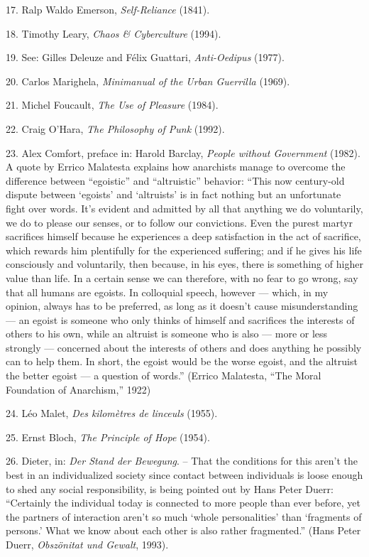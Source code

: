 {    17. Ralp Waldo Emerson, \textit{Self-Reliance} (1841).

    18. Timothy Leary, \textit{Chaos \& Cyberculture} (1994).

    19. See: Gilles Deleuze and Félix Guattari, \textit{Anti-Oedipus} (1977).

    20. Carlos Marighela, \textit{Minimanual of the Urban Guerrilla} (1969).

    21. Michel Foucault, \textit{The Use of Pleasure} (1984).

    22. Craig O’Hara, \textit{The Philosophy of Punk} (1992).

    23. Alex Comfort, preface in: Harold Barclay, \textit{People without
    Government} (1982). A quote by Errico Malatesta explains how anarchists
    manage to overcome the difference between “egoistic” and “altruistic”
    behavior: “This now century-old dispute between ‘egoists’ and ‘altruists’ is
    in fact nothing but an unfortunate fight over words. It’s evident and
    admitted by all that anything we do voluntarily, we do to please our senses,
    or to follow our convictions. Even the purest martyr sacrifices himself
    because he experiences a deep satisfaction in the act of sacrifice, which
    rewards him plentifully for the experienced suffering; and if he gives his
    life consciously and voluntarily, then because, in his eyes, there is
    something of higher value than life. In a certain sense we can therefore,
    with no fear to go wrong, say that all humans are egoists. In colloquial
    speech, however — which, in my opinion, always has to be preferred, as long
    as it doesn’t cause misunderstanding — an egoist is someone who only thinks
    of himself and sacrifices the interests of others to his own, while an
    altruist is someone who is also — more or less strongly — concerned about
    the interests of others and does anything he possibly can to help them. In
    short, the egoist would be the worse egoist, and the altruist the better
    egoist — a question of words.” (Errico Malatesta, “The Moral Foundation of
    Anarchism,” 1922)

    24. Léo Malet, \textit{Des kilomètres de linceuls} (1955).

    25. Ernst Bloch, \textit{The Principle of Hope} (1954).

    26. Dieter, in: \textit{Der Stand der Bewegung}. – That the conditions for
    this aren’t the best in an individualized society since contact between
    individuals is loose enough to shed any social responsibility, is being
    pointed out by Hans Peter Duerr: “Certainly the individual today is
    connected to more people than ever before, yet the partners of interaction
    aren’t so much ‘whole personalities’ than ‘fragments of persons.’ What we
    know about each other is also rather fragmented.” (Hans Peter Duerr,
    \textit{Obszönitat und Gewalt}, 1993).

}
